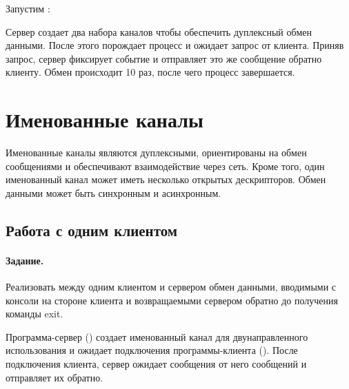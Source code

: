 



Запустим :





Сервер создает два набора каналов чтобы обеспечить дуплексный обмен данными. После этого порождает процесс  и ожидает запрос от клиента. Приняв запрос, сервер фиксирует событие и отправляет это же сообщение обратно клиенту. Обмен происходит 10 раз, после чего процесс завершается.

\section{Именованные каналы}

Именованные каналы являются дуплексными, ориентированы на обмен сообщениями и обеспечивают взаимодействие через сеть. Кроме того, один именованный канал может иметь несколько открытых дескрипторов. Обмен данными может быть синхронным и асинхронным.

\subsection{Работа с одним клиентом}

\paragraph{Задание.} Реализовать между одним клиентом и сервером обмен данными, вводимыми с консоли на стороне клиента и возвращаемыми сервером обратно до получения команды exit.

Программа-сервер () создает именованный канал для двунаправленного использования и ожидает подключения программы-клиента (). После подключения клиента, сервер ожидает сообщения от него сообщений и отправляет их обратно.





